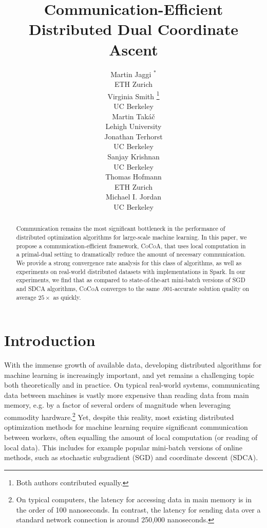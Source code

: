 \documentclass{article} %
\title{Communication-Efficient \\ Distributed Dual Coordinate Ascent}
\author{
Martin Jaggi $^{*}$\\
ETH Zurich \\
\And
Virginia Smith
\thanks{Both authors contributed equally.}
\\
UC Berkeley \\
\And
Martin Tak\'a\v{c}\\
Lehigh University \\
\AND
Jonathan Terhorst \\
UC Berkeley \\
\And
Sanjay Krishnan \\
UC Berkeley \\
\And
Thomas Hofmann\\
ETH Zurich \\
\And
Michael I. Jordan \\
UC Berkeley \\
}
\newcommand{\algname}{\textsc{CoCoA}\xspace}  %
\begin{document}
\maketitle

\begin{abstract} 
Communication remains the most significant bottleneck in the performance of distributed optimization algorithms for large-scale machine learning. In this paper, we propose a communication-efficient framework, \algname, that %
uses local computation in a primal-dual setting to dramatically reduce the amount of necessary communication. We provide a strong convergence rate analysis for this class of algorithms, as well as experiments on real-world distributed datasets with implementations in \textsf{\small Spark}. In our experiments, we find that as compared to state-of-the-art mini-batch versions of SGD and SDCA algorithms, \algname converges to the same $.001$-accurate solution quality on average $25\times$ %
as quickly. %
\end{abstract}




%
\section{Introduction} \label{introduction}

With the immense growth of available data, developing distributed algorithms
for machine learning is increasingly important, and yet
remains a challenging topic both theoretically and in practice.
%
On typical real-world systems, communicating data between machines is vastly more expensive than reading data from main memory,
e.g. by a factor of several orders of magnitude when leveraging commodity hardware.\footnote{On typical computers, the latency for accessing data in main memory is in the order of 100 nanoseconds. In contrast, the latency for sending data over a standard network connection is around 250,000 nanoseconds.}
Yet, despite this reality, most existing distributed optimization methods for machine learning require significant communication between workers, often equalling the amount of local computation (or reading of local data).
This includes for example popular mini-batch versions of online methods, such as stochastic subgradient (SGD) and coordinate descent (SDCA).
\end{document}
